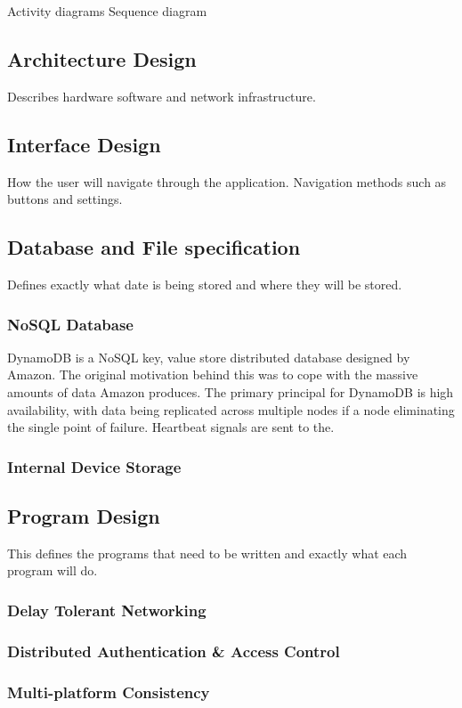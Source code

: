 \documentclass[a4paper, 11pt]{article}
\begin{document}
Activity diagrams
Sequence diagram

\subsection{Architecture Design} Describes hardware software and network infrastructure. 
\subsection{Interface Design} How the user will navigate through the application. Navigation methods such as buttons and settings.

\subsection{Database and File specification} Defines exactly what date is being stored and where they will be stored.

\subsubsection{NoSQL Database} 
DynamoDB is a NoSQL key, value store distributed database designed by Amazon. The original motivation behind this was to cope with the massive amounts of data Amazon produces. The primary principal for DynamoDB is high availability, with data being replicated across multiple nodes if a node eliminating the single point of failure. Heartbeat signals are sent to the. 
\subsubsection{Internal Device Storage} 

\subsection{Program Design}This defines the programs that need to be written and exactly what each program will do. 

\subsubsection{Delay Tolerant Networking}
\subsubsection{Distributed Authentication \& Access Control}
\subsubsection{Multi-platform Consistency}
\end{document}
